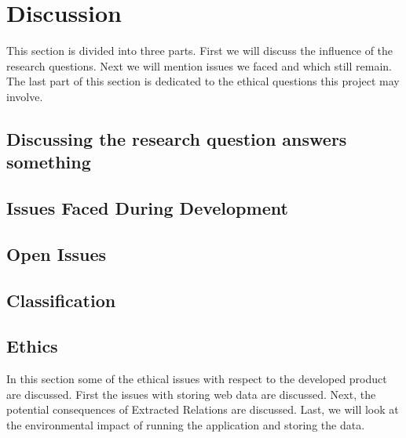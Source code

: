 \chapter{Discussion}

This section is divided into three parts. First we will discuss the influence of the research questions. Next we will mention issues we faced and which still remain. The last part of this section is dedicated to the ethical questions this project may involve.

\section{Discussing the research question answers something} 

\section{Issues Faced During Development}
    


\section{Open Issues}\label{sec:Discussion - Open Issues}

\section{Classification}

\section{Ethics}
In this section some of the ethical issues with respect to the developed product are discussed. First the issues with storing web data are discussed. Next, the potential consequences of Extracted Relations are discussed. Last, we will look at the environmental impact of running the application and storing the data.

